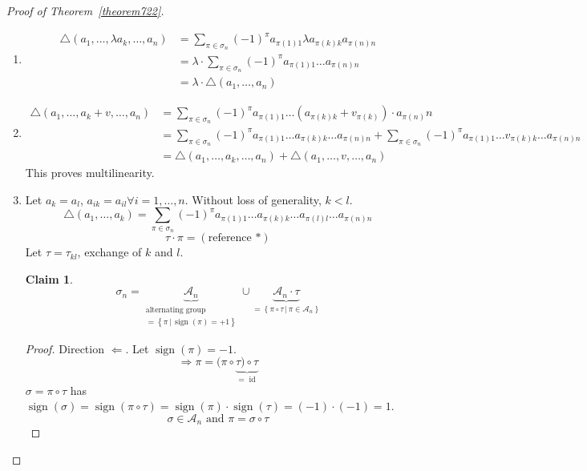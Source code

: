 \documentclass{article}
\newtheorem*{claim}{Claim}%
\newcommand{\setdef}[2]{\left\{\left.#1\,\right|\,#2\right\}}
\DeclareMathOperator{\sign}{sign}
\begin{document}
\begin{proof}[Proof of Theorem~\ref{theorem722}]
  \begin{enumerate}
    \item
      \begin{align*}
        \triangle(a_1, \dots, \lambda a_k, \dots, a_n)
          &= \sum_{\pi \in \sigma_n} (-1)^{\pi} a_{\pi(1)1} \lambda a_{\pi(k) k} a_{\pi(n) n} \\
          &= \lambda \cdot \sum_{\pi \in \sigma_n} (-1)^\pi a_{\pi(1) 1} \dots a_{\pi(n) n} \\
          &= \lambda \cdot \triangle(a_1, \dots, a_n)
      \end{align*}
    \item
      \begin{align*}
        \triangle(a_1, \dots, a_k + v, \dots, a_n)
          &= \sum_{\pi \in \sigma_n} (-1)^\pi a_{\pi(1) 1} \dots (a_{\pi(k) k} + v_{\pi(k)}) \cdot a_{\pi(n)} n \\
          &= \sum_{\pi \in \sigma_n} (-1)^\pi a_{\pi(1) 1} \dots a_{\pi(k) k} \dots a_{\pi(n) n} + \sum_{\pi \in \sigma_n} (-1)^\pi a_{\pi(1) 1} \dots v_{\pi(k) k} \dots a_{\pi(n) n} \\
          &= \triangle(a_1, \dots, a_k, \dots, a_n) + \triangle(a_1, \dots, v, \dots, a_n)
      \end{align*}
      This proves multilinearity.
    \item
      Let $a_k = a_l$, $a_{ik} = a_{il} \forall i = 1, \dots, n$.
      Without loss of generality, $k < l$.
      \[ \triangle(a_1, \dots, a_k) = \sum_{\pi \in \sigma_n} (-1)^\pi a_{\pi(1) 1} \dots a_{\pi(k) k} \dots a_{\pi(l) l} \dots a_{\pi(n) n} \]
      \[ \tau \cdot \pi = (\text{reference *}) \]
      Let $\tau = \tau_{kl}$, exchange of $k$ and $l$.
      \begin{claim}
        \[ \sigma_n = \underbrace{\mathcal A_n}_{\substack{\text{alternating group} \\ = \setdef{\pi}{\sign(\pi) = +1}}} \cup \underbrace{\mathcal A_{n} \cdot \tau}_{= \setdef{\pi \circ \tau}{\pi \in \mathcal A_n}} \]
      \end{claim}
      \begin{proof}
        Direction $\Leftarrow$.
        Let $\sign(\pi) = -1$.
        \[ \Rightarrow \pi = (\pi \circ \underbrace{\tau) \circ \tau}_{= \operatorname{id}} \]
        $\sigma = \pi \circ \tau$ has $\sign(\sigma) = \sign(\pi \circ \tau) = \sign(\pi) \cdot \sign(\tau) = (-1) \cdot (-1) = 1$.
        \[ \sigma \in \mathcal A_n \text{ and } \pi = \sigma \circ \tau \]

\end{proof}
\end{enumerate}
\end{proof}
\end{document}
